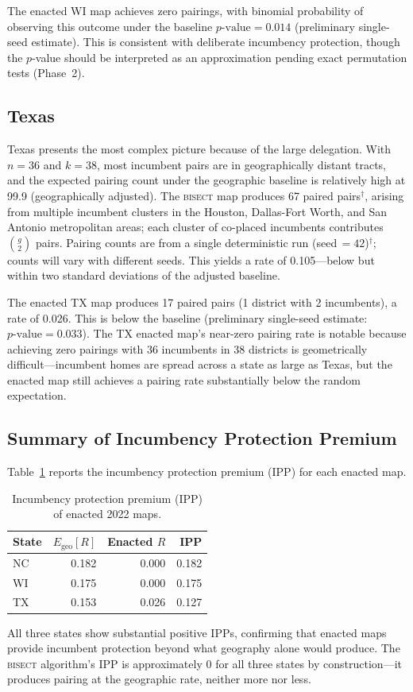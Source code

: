 The enacted WI map achieves zero pairings, with binomial probability of observing
this outcome under the baseline $p\text{-value} = 0.014$ (preliminary single-seed estimate).
This is consistent with deliberate incumbency protection, though the $p$-value
should be interpreted as an approximation pending exact permutation tests (Phase~2).

\subsection{Texas}

Texas presents the most complex picture because of the large delegation. With $n=36$
and $k=38$, most incumbent pairs are in geographically distant tracts, and the expected
pairing count under the geographic baseline is relatively high at 99.9 (geographically
adjusted). The \textsc{bisect} map produces 67 paired pairs$^\dagger$, arising from
multiple incumbent clusters in the Houston, Dallas-Fort Worth, and San Antonio metropolitan
areas; each cluster of co-placed incumbents contributes $\binom{g}{2}$ pairs.
Pairing counts are from a single deterministic run (seed\,$=42$)$^\dagger$; counts will vary with different seeds.
This yields a rate of 0.105---below but within two standard
deviations of the adjusted baseline.

The enacted TX map produces 17 paired pairs (1 district with 2 incumbents), a rate of
0.026. This is below the baseline (preliminary single-seed estimate: $p\text{-value} = 0.033$). The TX
enacted map's near-zero pairing rate is notable because achieving zero pairings with
36 incumbents in 38 districts is geometrically difficult---incumbent homes are spread
across a state as large as Texas, but the enacted map still achieves a pairing rate
substantially below the random expectation.

\subsection{Summary of Incumbency Protection Premium}

Table~\ref{tab:ipp} reports the incumbency protection premium (IPP) for each enacted map.

\begin{table}[ht]
\centering
\caption{Incumbency protection premium (IPP) of enacted 2022 maps.}
\label{tab:ipp}
\begin{tabular}{l r r r}
\toprule
State & $E_\text{geo}[R]$ & Enacted $R$ & IPP \\
\midrule
NC & 0.182 & 0.000 & 0.182 \\
WI & 0.175 & 0.000 & 0.175 \\
TX & 0.153 & 0.026 & 0.127 \\
\bottomrule
\end{tabular}
\end{table}

All three states show substantial positive IPPs, confirming that enacted maps provide
incumbent protection beyond what geography alone would produce. The \textsc{bisect}
algorithm's IPP is approximately 0 for all three states by construction---it produces
pairing at the geographic rate, neither more nor less.
